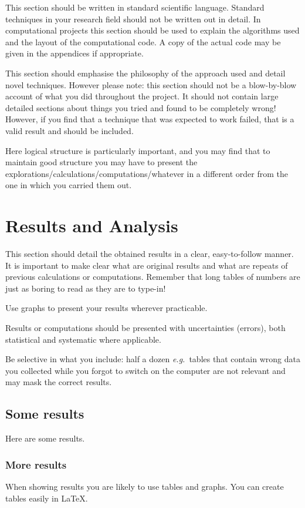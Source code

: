 \documentclass[12pt,a4paper]{report}
\begin{document}
This section should be written in standard scientific
language. Standard techniques in your research field should not be
written out in detail. In computational projects this section should
be used to explain the algorithms used and the layout of the
computational code. A copy of the actual code may be given in the
appendices if appropriate.

This section should emphasise the philosophy of the approach used and
detail novel techniques. However please note: this section should not
be a blow-by-blow account of what you did throughout the project. It
should not contain large detailed sections about things you tried and
found to be completely wrong! However, if you find that a technique
that was expected to work failed, that is a valid result and should be
included.

Here logical structure is particularly important, and you may find
that to maintain good structure you may have to present the
explorations/calculations/computations/whatever in a different order
from the one in which you carried them out.


\chapter{Results and Analysis}

This section should detail the obtained results in a clear,
easy-to-follow manner. It is important to make clear what are original
results and what are repeats of previous calculations or computations.
Remember that long tables of numbers are just as boring to read as
they are to type-in!

Use graphs to present your results wherever practicable.

Results or computations should be presented with uncertainties
(errors), both statistical and systematic where applicable.

Be selective in what you include: half a dozen \emph{e.g.}~tables that
contain wrong data you collected while you forgot to switch on the
computer are not relevant and may mask the correct results.


\section{Some results}
Here are some results.

\subsection{More results}
When showing results you are likely to use tables and graphs. You can
create tables easily in \LaTeX.
\end{document}
